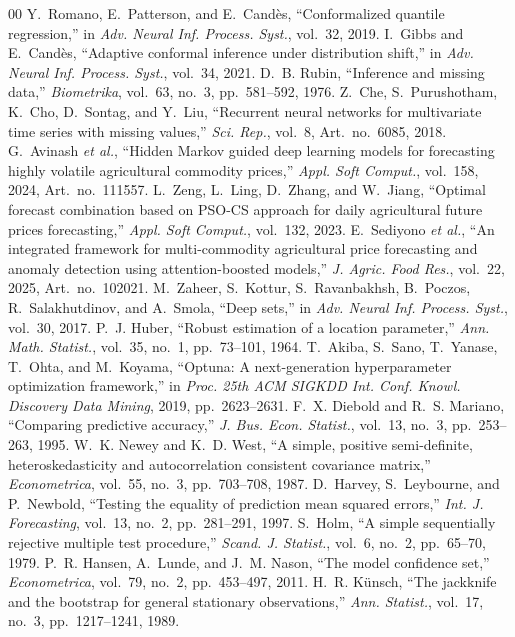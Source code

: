 \documentclass{ieeeaccess}
\begin{document}
\begin{thebibliography}{00}
 Y.~Romano, E.~Patterson, and E.~Cand\`{e}s, ``Conformalized quantile regression,'' in \emph{Adv. Neural Inf. Process. Syst.}, vol.~32, 2019.
 I.~Gibbs and E.~Cand\`{e}s, ``Adaptive conformal inference under distribution shift,'' in \emph{Adv. Neural Inf. Process. Syst.}, vol.~34, 2021.
 D.~B. Rubin, ``Inference and missing data,'' \emph{Biometrika}, vol.~63, no.~3, pp.~581--592, 1976.
 Z.~Che, S.~Purushotham, K.~Cho, D.~Sontag, and Y.~Liu, ``Recurrent neural networks for multivariate time series with missing values,'' \emph{Sci. Rep.}, vol.~8, Art.\ no.~6085, 2018.
 G.~Avinash \emph{et al.}, ``Hidden Markov guided deep learning models for forecasting highly volatile agricultural commodity prices,'' \emph{Appl. Soft Comput.}, vol.~158, 2024, Art.\ no.~111557.
 L.~Zeng, L.~Ling, D.~Zhang, and W.~Jiang, ``Optimal forecast combination based on PSO-CS approach for daily agricultural future prices forecasting,'' \emph{Appl. Soft Comput.}, vol.~132, 2023.
 E.~Sediyono \emph{et al.}, ``An integrated framework for multi-commodity agricultural price forecasting and anomaly detection using attention-boosted models,'' \emph{J. Agric. Food Res.}, vol.~22, 2025, Art.\ no.~102021.
 M.~Zaheer, S.~Kottur, S.~Ravanbakhsh, B.~Poczos, R.~Salakhutdinov, and A.~Smola, ``Deep sets,'' in \emph{Adv. Neural Inf. Process. Syst.}, vol.~30, 2017.
 P.~J. Huber, ``Robust estimation of a location parameter,'' \emph{Ann. Math. Statist.}, vol.~35, no.~1, pp.~73--101, 1964.
 T.~Akiba, S.~Sano, T.~Yanase, T.~Ohta, and M.~Koyama, ``Optuna: A next-generation hyperparameter optimization framework,'' in \emph{Proc. 25th ACM SIGKDD Int. Conf. Knowl. Discovery Data Mining}, 2019, pp.~2623--2631.
 F.~X. Diebold and R.~S. Mariano, ``Comparing predictive accuracy,'' \emph{J. Bus. Econ. Statist.}, vol.~13, no.~3, pp.~253--263, 1995.
 W.~K. Newey and K.~D. West, ``A simple, positive semi-definite, heteroskedasticity and autocorrelation consistent covariance matrix,'' \emph{Econometrica}, vol.~55, no.~3, pp.~703--708, 1987.
 D.~Harvey, S.~Leybourne, and P.~Newbold, ``Testing the equality of prediction mean squared errors,'' \emph{Int. J. Forecasting}, vol.~13, no.~2, pp.~281--291, 1997.
 S.~Holm, ``A simple sequentially rejective multiple test procedure,'' \emph{Scand. J. Statist.}, vol.~6, no.~2, pp.~65--70, 1979.
 P.~R. Hansen, A.~Lunde, and J.~M. Nason, ``The model confidence set,'' \emph{Econometrica}, vol.~79, no.~2, pp.~453--497, 2011.
 H.~R. K\"{u}nsch, ``The jackknife and the bootstrap for general stationary observations,'' \emph{Ann. Statist.}, vol.~17, no.~3, pp.~1217--1241, 1989.
\end{thebibliography}

\EOD
\end{document}
